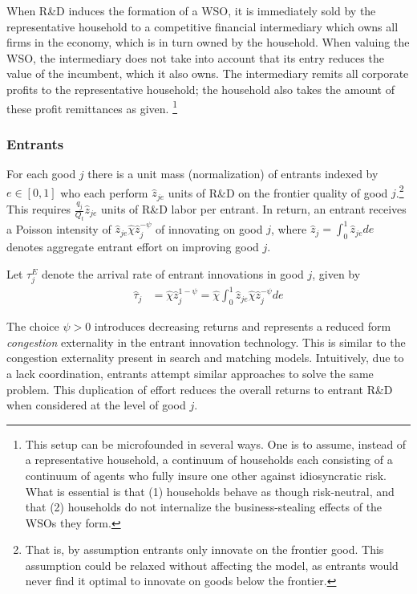 \documentclass[11pt,english]{article}
\begin{document}
When R\&D induces the formation of a WSO, it is immediately sold by the representative household to a competitive financial intermediary which owns all firms in the economy, which is in turn owned by the household. When valuing the WSO, the intermediary does not take into account that its entry reduces the value of the incumbent, which it also owns. The intermediary remits all corporate profits to the representative household; the household also takes the amount of these profit remittances as given. \footnote{This setup can be microfounded in several ways. One is to assume, instead of a representative household, a continuum of households each consisting of a continuum of agents who fully insure one other against idiosyncratic risk. What is essential is that (1) households behave as though risk-neutral, and that (2) households do not internalize the business-stealing effects of the WSOs they form.} 



\subsubsection{Entrants} \label{subsubsec:entrants}

For each good $j$ there is a unit mass (normalization) of entrants indexed by $e \in [0,1]$ who each perform $\hat{z}_{je}$ units of R\&D on the frontier quality of good $j$.\footnote{That is, by assumption entrants only innovate on the frontier good. This assumption could be relaxed without affecting the model, as entrants would never find it optimal to innovate on goods below the frontier.} This requires $\frac{q_j}{Q_t}\hat{z}_{je}$ units of R\&D labor per entrant. In return, an entrant receives a Poisson intensity of $\hat{z}_{je} \hat{\chi} \hat{z}_j^{-\psi}$ of innovating on good $j$, where $\hat{z}_j = \int_0^1 \hat{z}_{je} de$ denotes aggregate entrant effort on improving good $j$. 

Let $\tau_j^E$ denote the arrival rate of entrant innovations in good $j$, given by
\begin{align*}
	\hat{\tau}_j &= \hat{\chi} \hat{z}_j^{1-\psi} = \hat{\chi} \int_0^1 \hat{z}_{je} \hat{\chi} \hat{z}_j^{-\psi} de 
\end{align*}

The choice $\psi > 0$ introduces decreasing returns and represents a reduced form \textit{congestion} externality in the entrant innovation technology. This is similar to the congestion externality present in search and matching models. Intuitively, due to a lack coordination, entrants attempt similar approaches to solve the same problem. This duplication of effort reduces the overall returns to entrant R\&D when considered at the level of good $j$.
\end{document}
